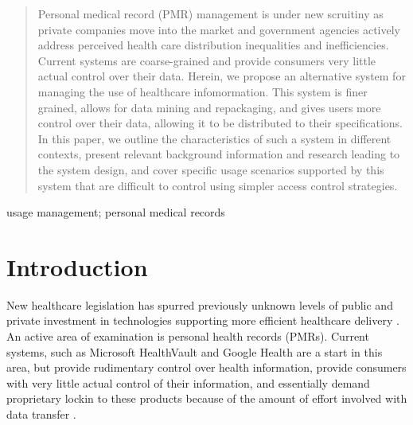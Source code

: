 \documentclass[10pt, conference, compsocconf]{IEEEtran}
\begin{document}
\begin{abstract}
Personal medical record (PMR) management is under new scruitiny as private companies move into the market and government agencies actively address perceived health care distribution inequalities and inefficiencies.  Current systems are coarse-grained and provide consumers very little actual control over their data.  Herein, we propose an alternative system for managing the use of healthcare infomormation.  This system is finer grained, allows for data mining and repackaging, and gives users more control over their data, allowing it to be distributed to their specifications.  In this paper, we outline the characteristics of such a system in different contexts, present relevant background information and research leading to the system design, and cover specific usage scenarios supported by this system that are difficult to control using simpler access control strategies.
\end{abstract}

\begin{IEEEkeywords}
usage management; personal medical records

\end{IEEEkeywords}

%
\IEEEpeerreviewmaketitle

\section{Introduction}
New healthcare legislation has spurred previously unknown levels of public and private investment in technologies supporting more efficient healthcare delivery \cite{Emr:Web:Recovery}.   An active area of examination is personal health records (PMRs).  Current systems, such as Microsoft HealthVault and Google Health are a start in this area, but provide rudimentary control over health information, provide consumers with very little actual control of their information, and essentially demand proprietary lockin to these products because of the amount of effort involved with data transfer \cite{Emr:EvaluationHealthInf}.
\end{document}
